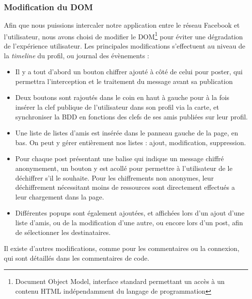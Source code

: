\documentclass[a4paper,11pt,french]{article}
\begin{document}
\subsubsection{Modification du DOM}
Afin que nous puissions intercaler notre application entre le réseau Facebook et 
l'utilisateur, nous avons choisi de modifier le DOM\footnote{Document Object Model,
interface standard permettant un accès à un contenu HTML indépendamment du langage
de programmation} pour éviter une dégradation de l'expérience utilisateur. Les
principales modifications s'effectuent au niveau de la \emph{timeline} du profil,
ou journal des évènements :
\begin{itemize}
\item Il y a tout d'abord un bouton chiffrer ajouté à côté
de celui pour poster, qui permettra l'interception et le traitement du message
avant sa publication
\item Deux boutons sont rajoutés dans le coin en haut à gauche pour à la fois
insérer la clef publique de l'utilisateur dans son profil via la carte, et 
synchroniser la BDD en fonctions des clefs de ses amis publiées sur leur profil.
\item Une liste de listes d'amis est insérée dans le panneau gauche de la page, 
en bas. On peut y gérer entièrement nos listes : ajout, modification, suppression.
\item Pour chaque post présentant une balise qui indique un message chiffré 
anonymement, un bouton y est acollé pour permettre à l'utilisateur de le déchiffrer
s'il le souhaite. Pour les chiffrements non anonymes, leur déchiffrement nécessitant
moins de ressources sont directement effectués a leur chargement dans la page.
\item Différentes popups sont également ajoutées, et affichées lors d'un ajout d'une
liste d'amis, ou de la modification d'une autre, ou encore lors d'un post, afin
de sélectionner les destinataires.
\end{itemize}
Il existe d'autres modifications, comme pour les commentaires ou la connexion,
qui sont détaillés dans les commentaires de code.
\end{document}
